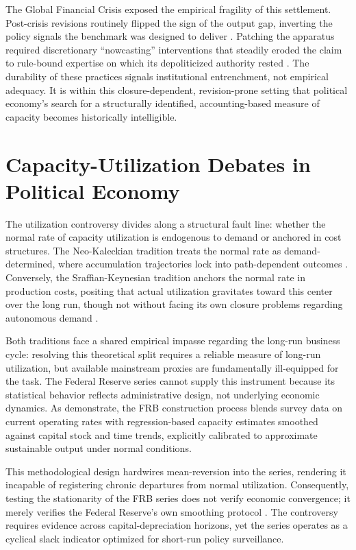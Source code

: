 The Global Financial Crisis exposed the empirical fragility of this settlement. Post-crisis revisions routinely flipped the sign of the output gap, inverting the policy signals the benchmark was designed to deliver \citep{CerraFatasSaxena2023; BarkemaGudmundssonMrkaic2020}. Patching the apparatus required discretionary ``nowcasting'' interventions \citep{AastveitTrovik2014; Berger2023} that steadily eroded the claim to rule-bound expertise on which its depoliticized authority rested \citep{Foster2024; ArgyroulisVagdoutis2025}. The durability of these practices signals institutional entrenchment, not empirical adequacy. It is within this closure-dependent, revision-prone setting that political economy's search for a structurally identified, accounting-based measure of capacity becomes historically intelligible.

\section{Capacity-Utilization Debates in Political Economy}

The utilization controversy divides along a structural fault line: whether the normal rate of capacity utilization is endogenous to demand or anchored in cost structures. The Neo-Kaleckian tradition treats the normal rate as demand-determined, where accumulation trajectories lock into path-dependent outcomes \citep{Lavoie1995; Nikiforos2013; Setterfield2020}. Conversely, the Sraffian-Keynesian tradition anchors the normal rate in production costs, positing that actual utilization gravitates toward this center over the long run, though not without facing its own closure problems regarding autonomous demand \citep{Nikiforos2018}. 

Both traditions face a shared empirical impasse regarding the long-run business cycle: resolving this theoretical split requires a reliable measure of long-run utilization, but available mainstream proxies are fundamentally ill-equipped for the task. The Federal Reserve series cannot supply this instrument because its statistical behavior reflects administrative design, not underlying economic dynamics. As \citet{Shapiro1989} demonstrate, the FRB construction process blends survey data on current operating rates with regression-based capacity estimates smoothed against capital stock and time trends, explicitly calibrated to approximate sustainable output under normal conditions. 

This methodological design hardwires mean-reversion into the series, rendering it incapable of registering chronic departures from normal utilization. Consequently, testing the stationarity of the FRB series does not verify economic convergence; it merely verifies the Federal Reserve’s own smoothing protocol \citep{Nikiforos2016; Nikiforos2021}. The controversy requires evidence across capital-depreciation horizons, yet the series operates as a cyclical slack indicator optimized for short-run policy surveillance. 

